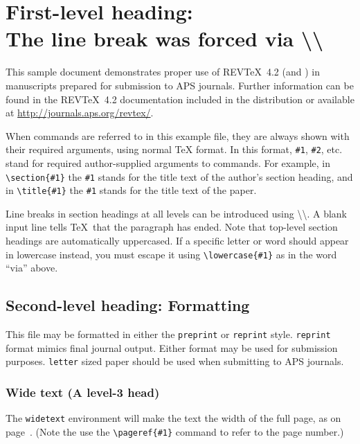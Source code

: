 \documentclass[%
 preprint, linenumbers,
 amsmath,amssymb,
 aps, physrev,
]{revtex4-2}
\begin{document}

\section{\label{sec:level1}First-level heading:\protect\\ The line
break was forced \lowercase{via} \textbackslash\textbackslash}

This sample document demonstrates proper use of REV\TeX~4.2 (and
\LaTeXe) in manuscripts prepared for submission to APS
journals. Further information can be found in the REV\TeX~4.2
documentation included in the distribution or available at
\url{http://journals.aps.org/revtex/}.

When commands are referred to in this example file, they are always
shown with their required arguments, using normal \TeX{} format. In
this format, \verb+#1+, \verb+#2+, etc. stand for required
author-supplied arguments to commands. For example, in
\verb+\section{#1}+ the \verb+#1+ stands for the title text of the
author's section heading, and in \verb+\title{#1}+ the \verb+#1+
stands for the title text of the paper.

Line breaks in section headings at all levels can be introduced using
\textbackslash\textbackslash. A blank input line tells \TeX\ that the
paragraph has ended. Note that top-level section headings are
automatically uppercased. If a specific letter or word should appear in
lowercase instead, you must escape it using \verb+\lowercase{#1}+ as
in the word ``via'' above.

\subsection{\label{sec:level2}Second-level heading: Formatting}

This file may be formatted in either the \texttt{preprint} or
\texttt{reprint} style. \texttt{reprint} format mimics final journal output. 
Either format may be used for submission purposes. \texttt{letter} sized paper should
be used when submitting to APS journals.

\subsubsection{\textbf{Wide text (A level-3 head)}}
The \texttt{widetext} environment will make the text the width of the
full page, as on page~\pageref{eq:wideeq}. (Note the use the
\verb+\pageref{#1}+ command to refer to the page number.) 
\end{document}
